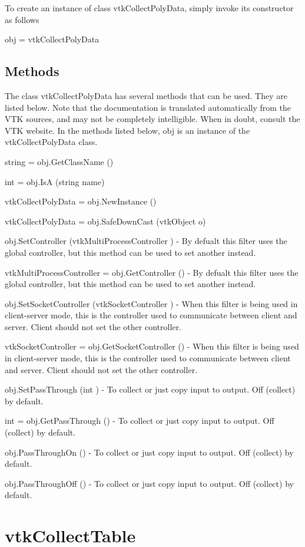 To create an instance of class vtk\-Collect\-Poly\-Data, simply invoke its constructor as follows \begin{DoxyVerb}  obj = vtkCollectPolyData
\end{DoxyVerb}
 \hypertarget{vtkwidgets_vtkxyplotwidget_Methods}{}\subsection{Methods}\label{vtkwidgets_vtkxyplotwidget_Methods}
The class vtk\-Collect\-Poly\-Data has several methods that can be used. They are listed below. Note that the documentation is translated automatically from the V\-T\-K sources, and may not be completely intelligible. When in doubt, consult the V\-T\-K website. In the methods listed below, {\ttfamily obj} is an instance of the vtk\-Collect\-Poly\-Data class. 
\begin{DoxyItemize}
\item {\ttfamily string = obj.\-Get\-Class\-Name ()}  
\item {\ttfamily int = obj.\-Is\-A (string name)}  
\item {\ttfamily vtk\-Collect\-Poly\-Data = obj.\-New\-Instance ()}  
\item {\ttfamily vtk\-Collect\-Poly\-Data = obj.\-Safe\-Down\-Cast (vtk\-Object o)}  
\item {\ttfamily obj.\-Set\-Controller (vtk\-Multi\-Process\-Controller )} -\/ By defualt this filter uses the global controller, but this method can be used to set another instead.  
\item {\ttfamily vtk\-Multi\-Process\-Controller = obj.\-Get\-Controller ()} -\/ By defualt this filter uses the global controller, but this method can be used to set another instead.  
\item {\ttfamily obj.\-Set\-Socket\-Controller (vtk\-Socket\-Controller )} -\/ When this filter is being used in client-\/server mode, this is the controller used to communicate between client and server. Client should not set the other controller.  
\item {\ttfamily vtk\-Socket\-Controller = obj.\-Get\-Socket\-Controller ()} -\/ When this filter is being used in client-\/server mode, this is the controller used to communicate between client and server. Client should not set the other controller.  
\item {\ttfamily obj.\-Set\-Pass\-Through (int )} -\/ To collect or just copy input to output. Off (collect) by default.  
\item {\ttfamily int = obj.\-Get\-Pass\-Through ()} -\/ To collect or just copy input to output. Off (collect) by default.  
\item {\ttfamily obj.\-Pass\-Through\-On ()} -\/ To collect or just copy input to output. Off (collect) by default.  
\item {\ttfamily obj.\-Pass\-Through\-Off ()} -\/ To collect or just copy input to output. Off (collect) by default.  
\end{DoxyItemize}\hypertarget{vtkparallel_vtkcollecttable}{}\section{vtk\-Collect\-Table}\label{vtkparallel_vtkcollecttable}
